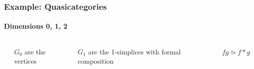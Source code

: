 \documentclass{beamer}
\newcommand{\newthought}[1]{\medskip\noindent\fbox{{#1}}}
\begin{document}
%
%
%
%
%
%
%
%
%
%



\begin{frame}

\frametitle{Example: Quasicategories}
\framesubtitle{Dimensions 0, 1, 2}

\vspace{-1cm}

\begin{columns}[t]





\begin{center}
\end{center}

\bigskip

\newthought{$\Delta^0: $} $G_0$ are the vertices


\newthought{$\Delta^1: $} $G_1$ are the 1-simplices with formal composition





\bigskip

\newthought{$\Delta^2: $} $fg \simeq f*g$



\end{columns}



\end{frame}
\end{document}
